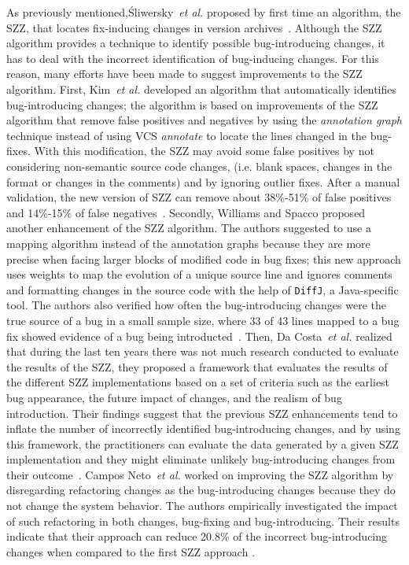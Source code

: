 \documentclass[a4paper, 12pt]{book}
\begin{document}
As previously mentioned,\'Sliwersky~\emph{et al.} proposed by first time an algorithm, the SZZ, that locates fix-inducing changes in version archives~\cite{sliwerski2005changes}. Although the SZZ algorithm provides a technique to identify possible bug-introducing changes, it has to deal with the incorrect identification of bug-inducing changes. For this reason, many efforts have been made to suggest improvements to the SZZ algorithm. First, Kim~\textit{et al.} developed an algorithm that automatically identifies bug-introducing changes; the algorithm is based on improvements of the SZZ algorithm that remove false positives and negatives by using the \textit{annotation graph} technique instead of using VCS \textit{annotate} to locate the lines changed in the bug-fixes. With this modification, the SZZ may avoid some false positives by not considering 
non-semantic source code changes, (i.e. blank spaces, changes in the format or changes in the comments) and by ignoring outlier fixes. After a manual validation, the new version of SZZ can remove about 38\%-51\% of false positives and 14\%-15\% of false negatives~\cite{kim2006automatic}. Secondly, Williams and Spacco proposed another enhancement of the SZZ algorithm. The authors suggested to use a mapping algorithm instead of the annotation graphs because they are more precise when facing larger blocks of modified code in bug fixes; this new approach uses weights to map the evolution of a unique source line and ignores comments and formatting changes in the source code with the help of \texttt{DiffJ}, a Java-specific tool. The authors also verified how often the bug-introducing changes were the true source of a bug in a small sample size, where 33 of 43 lines mapped to a bug fix showed evidence of a bug being introducted~\cite{williams2008szz}. Then, Da Costa~\textit{et al.} realized that during the last ten years there was not much research conducted to evaluate the results of the SZZ, they proposed a framework that evaluates the results of the different SZZ implementations based on a set of criteria such as the earliest bug appearance, the future impact of changes, and the realism of bug introduction. Their findings suggest that the previous SZZ enhancements tend to inflate the number of incorrectly identified bug-introducing changes, and by using this framework, the practitioners can evaluate the data generated by a given SZZ implementation and they might eliminate unlikely bug-introducing changes from their outcome~\cite{da2016framework}. Campos Neto~\textit{et al.} worked on improving the SZZ algorithm by disregarding refactoring changes as the bug-introducing changes because they do not change the system behavior. The authors empirically investigated the impact of such refactoring in both changes, bug-fixing and bug-introducing. Their results indicate that their approach can reduce 20.8\% of the incorrect bug-introducing changes when compared to the first SZZ approach \cite{neto2018impact}.
\end{document}
